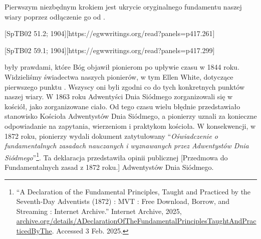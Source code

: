 Pierwszym niezbędnym krokiem jest ukrycie oryginalnego fundamentu naszej wiary poprzez odłączenie go od .

[SpTB02 51.2; 1904][https://egwwritings.org/read?panels=p417.261]

[SpTB02 59.1; 1904][https://egwwritings.org/read?panels=p417.299]

 były prawdami, które Bóg objawił pionierom po upływie czasu w 1844 roku. Widzieliśmy świadectwa naszych pionierów, w tym Ellen White, dotyczące pierwszego punktu . Wszyscy oni byli zgodni co do tych konkretnych punktów naszej wiary. W 1863 roku Adwentyści Dnia Siódmego zorganizowali się w kościół, jako zorganizowane ciało. Od tego czasu wielu błędnie przedstawiało stanowisko Kościoła Adwentystów Dnia Siódmego, a pionierzy uznali za konieczne odpowiadanie na zapytania,  wierzeniom i praktykom kościoła. W konsekwencji, w 1872 roku, pionierzy wydali dokument zatytułowany “\textit{Oświadczenie o fundamentalnych zasadach nauczanych i wyznawanych przez Adwentystów Dnia Siódmego}”\footnote{“A Declaration of the Fundamental Principles, Taught and Practiced by the Seventh-Day Adventists (1872) : MVT : Free Download, Borrow, and Streaming : Internet Archive.” Internet Archive, 2025, \href{https://archive.org/details/ADeclarationOfTheFundamentalPrinciplesTaughtAndPracticedByThe}{archive.org/details/ADeclarationOfTheFundamentalPrinciplesTaughtAndPracticedByThe}. Accessed 3 Feb. 2025.}. Ta deklaracja przedstawiła opinii publicznej [Przedmowa do Fundamentalnych zasad z 1872 roku.] Adwentystów Dnia Siódmego.

